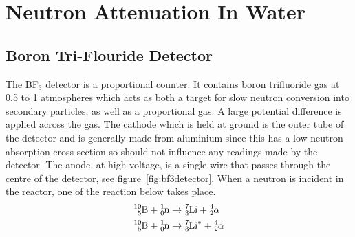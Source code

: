 \section{Neutron Attenuation In Water} %
\label{sec:neutron_attenuation_in_water}

\subsection{Boron Tri-Flouride Detector} %
\label{ssub:boron_tri_flouride_detector}
The BF$_3$ detector is a proportional counter. It contains boron trifluoride gas at 0.5 to 1 atmospheres which acts as both a target for slow neutron conversion into secondary particles, as well as a proportional gas. A large potential difference is applied across the gas. The cathode which is held at ground is the outer tube of the detector and is generally made from aluminium since this has a low neutron absorption cross section so should not influence any readings made by the detector. The anode, at high voltage, is a single wire that passes through the centre of the detector, see figure~\ref{fig:bf3detector}. When a neutron is incident in the reactor, one of the reaction below takes place\cite{krane}.
\begin{align}
	\cf{^{10}_{5}B} + \cf{^{1}_{0}n} &\rightarrow \cf{^{7}_{3}Li} + \cf{^{4}_{2}\alpha} \label{eq:bf31}\\
	\cf{^{10}_{5}B} + \cf{^{1}_{0}n} &\rightarrow \cf{^{7}_{3}Li^*} + \cf{^{4}_{2}\alpha} \label{eq:bf32}
\end{align} 

